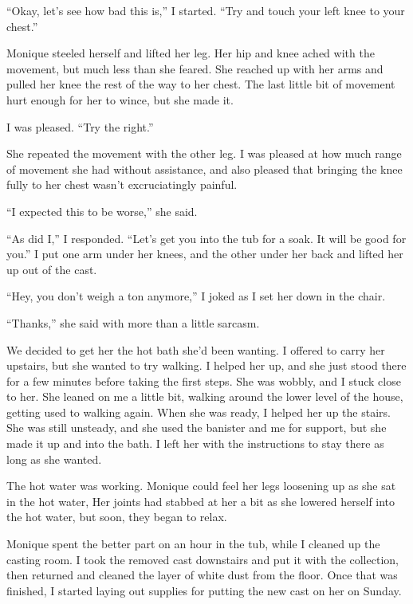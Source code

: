 ``Okay, let's see how bad this is,'' I started. ``Try and touch your left knee to your chest.''

\begin{thought}
Monique steeled herself and lifted her leg. Her hip and knee ached with the movement, but
much less than she feared. She reached up with her arms and pulled her knee the rest of the way
to her chest. The last little bit of movement hurt enough for her to wince, but she made it.
\end{thought}

I was pleased. ``Try the right.''

She repeated the movement with the other leg. I was pleased at how much range of movement
she had without assistance, and also pleased that bringing the knee fully to her chest wasn't
excruciatingly painful.

``I expected this to be worse,'' she said.

``As did I,'' I responded. ``Let's get you into the tub for a soak. It will be good for you.''
I put one arm under her knees, and the other under her back and lifted her up out of the cast.

``Hey, you don't weigh a ton anymore,'' I joked as I set her down in the chair.

``Thanks,'' she said with more than a little sarcasm.

We decided to get her the hot bath she'd been wanting. I offered to carry her upstairs, but
she wanted to try walking. I helped her up, and she just stood there for a few minutes before
taking the first steps. She was wobbly, and I stuck close to her. She leaned on me a little bit,
walking around the lower level of the house, getting used to walking again. When she was ready,
I helped her up the stairs. She was still unsteady, and she used the banister and me for
support, but she made it up and into the bath. I left her with the instructions to stay there as
long as she wanted.

\begin{thought}
The hot water was working. Monique could feel her legs loosening up as she sat in the hot
water, Her joints had stabbed at her a bit as she lowered herself into the hot water, but soon,
they began to relax.
\end{thought}

Monique spent the better part on an hour in the tub, while I cleaned up the casting room. I
took the removed cast downstairs and put it with the collection, then returned and cleaned the
layer of white dust from the floor. Once that was finished, I started laying out supplies for
putting the new cast on her on Sunday.

